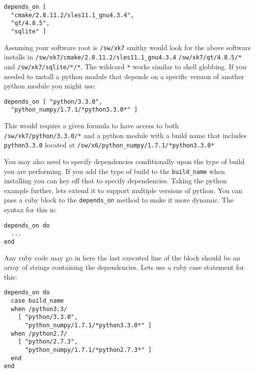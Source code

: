 \documentclass{acm_proc_article-sp}
\begin{document}
\begin{quoting}
\begin{verbatim}
depends_on [
  "cmake/2.8.11.2/sles11.1_gnu4.3.4",
  "qt/4.8.5",
  "sqlite" ]
\end{verbatim}
\end{quoting}

Assuming your software root is \texttt{/sw/xk7} smithy would look for the above
software installs in \texttt{/sw/xk7/cmake/2.8.11.2/sles11.1\_gnu4.3.4}
\texttt{/sw/xk7/qt/4.8.5/*} and \texttt{/sw/xk7/sqlite/*/*}. The wildcard
\texttt{*} works similar to shell globbing. If you needed to install a python
module that depends on a specific version of another python module you might
use:

\begin{quoting}
\begin{verbatim}
depends_on [ "python/3.3.0",
  "python_numpy/1.7.1/*python3.3.0*" ]
\end{verbatim}
\end{quoting}

This would require a given formula to have access to both
\texttt{/sw/xk7/python/3.3.0/*} and a python module with a build name that includes
\texttt{python3.3.0} located at \texttt{/sw/x6/python\_numpy/1.7.1/*python3.3.0*}

You may also need to specify dependencies conditionally upon the type of build
you are performing. If you add the type of build to the \texttt{build\_name}
when installing you can key off that to specify dependencies. Taking the python
example further, lets extend it to support multiple versions of python. You can
pass a ruby block to the \texttt{depends\_on} method to make it more dynamic.
The syntax for this is:

\begin{quoting}
\begin{verbatim}
depends_on do
  ...
end
\end{verbatim}
\end{quoting}

Any ruby code may go in here the last executed line of the block should be an
array of strings containing the dependencies. Lets use a ruby case statement
for this:

\begin{quoting}
\begin{verbatim}
depends_on do
  case build_name
  when /python3.3/
    [ "python/3.3.0",
      "python_numpy/1.7.1/*python3.3.0*" ]
  when /python2.7/
    [ "python/2.7.3",
      "python_numpy/1.7.1/*python2.7.3*" ]
  end
end
\end{verbatim}
\end{quoting}
\end{document}
